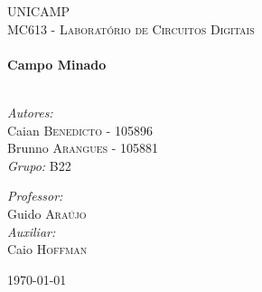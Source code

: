 \begin{titlepage}

\begin{center}


\begin{center}
  \begin{figure}[t]
    \centering
    \hfill
  \end{figure}
\end{center}

\textsc{\LARGE UNICAMP}\\[1.5cm]

\textsc{\Large MC613 - Laboratório de Circuitos Digitais}\\[0.5cm]


\HRule \\[0.4cm]
{ \huge \bfseries Campo Minado}\\[0.1cm]
\HRule \\[1.5cm]

\begin{minipage}{0.4\textwidth}
\begin{flushleft} \large
\emph{Autores:}\\
Caian \textsc{Benedicto} - 105896\\
Brunno \textsc{Arangues} - 105881\\
\emph{Grupo:} B22\\
\end{flushleft}
\end{minipage}
\begin{minipage}{0.4\textwidth}
\begin{flushright} \large
\emph{Professor:} \\
Guido \textsc{Araújo} \\
\emph{Auxiliar:} \\
Caio \textsc{Hoffman} \\
\end{flushright}
\end{minipage}

\vfill

{\large \today}

\end{center}

\end{titlepage}